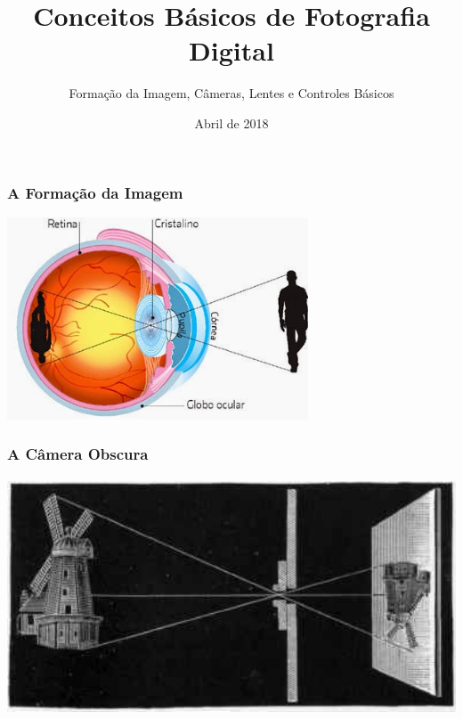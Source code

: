 


\title{Conceitos Básicos de Fotografia Digital}
\subtitle{Formação da Imagem, Câmeras, Lentes e Controles Básicos}
\author{}
\date{Abril de 2018}



\coverframe

\begin{frame}
    \frametitle{A Formação da Imagem}
\begin{center}
    \includegraphics[height=6cm]{images/olho.jpg}
\end{center}
\end{frame}

\begin{frame}
    \frametitle{A Câmera Obscura}
\begin{center}
    \includegraphics[height=7cm]{images/pinhole.jpg}
\end{center}
\end{frame}

